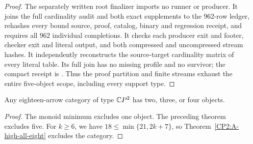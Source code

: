 \begin{proof}
The separately written root finalizer
 imports no runner or
producer. It joins the full cardinality audit and both exact
supplements to the 962-row ledger, rehashes every bound source,
proof, catalog, binary and regression receipt, and requires all
962 individual completions. It checks each producer exit and
footer, checker exit and literal output, and both compressed
and uncompressed stream hashes. It independently reconstructs
the source-target cardinality matrix of every literal table.
Its full join has no missing profile and no survivor; the
compact receipt is .
Thus the proof partition and finite streams exhaust the entire
five-object scope, including every support type.
\end{proof}

\begin{corollary}
\label{CP2:A-eighteen-at-most-four-objects}
Any eighteen-arrow category of type $\mathbb{C}P^2$ has two, three,
or four objects.
\end{corollary}
\begin{proof}
The monoid minimum excludes one object. The preceding theorem
excludes five. For $k\geq6$, we have
$18\leq\min\{21,2k+7\}$, so
Theorem~\ref{CP2:A-high-all-eight} excludes the category.
\end{proof}
